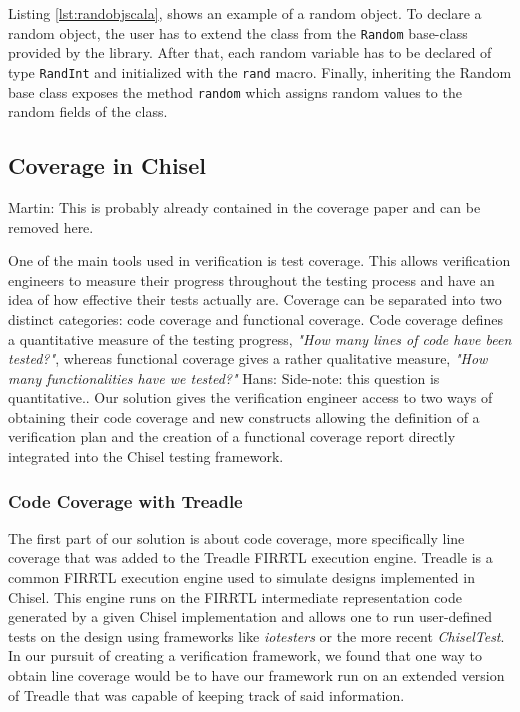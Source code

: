 \documentclass[conference]{IEEEtran}
\newcommand{\code}[1]{{\small{\texttt{#1}}}}
\newcommand{\martin}[1]{{\color{blue} Martin: #1}}
\newcommand{\hjd}[1]{{\color{pink} Hans: #1}}
\begin{document}
Listing \ref{lst:randobjscala}, shows an example of a random object. To declare a random object, the user has to extend
the class from the \code{Random} base-class provided by the library. After that, each random variable has to be declared of type \code{RandInt} and initialized with the \code{rand} macro. Finally, inheriting the Random base class exposes the method \code{random} which assigns random values to the random fields of the class.

\subsection{Coverage in Chisel}

\martin{This is probably already contained in the coverage paper and can be removed here.}

One of the main tools used in verification is test coverage. This allows verification engineers to measure their progress throughout the testing process and have an idea of how effective their tests actually are. Coverage can be separated into two distinct categories: code coverage and functional coverage. Code coverage defines a quantitative measure of the testing progress, \textit{"How many lines of code have been tested?"}, whereas functional coverage gives a rather qualitative measure, \textit{"How many functionalities have we tested?"} \hjd{Side-note: this question is quantitative.}.  Our solution gives the verification engineer access to two ways of obtaining their code coverage and new constructs allowing the definition of a verification plan and the creation of a functional coverage report directly integrated into the Chisel testing framework.

\subsubsection{Code Coverage with Treadle}  
The first part of our solution is about code coverage, more specifically line coverage that was added to the Treadle FIRRTL execution engine. Treadle is a common FIRRTL execution engine used to simulate designs implemented in Chisel. This engine runs on the FIRRTL intermediate representation code generated by a given Chisel implementation and allows one to run user-defined tests on the design using frameworks like \textit{iotesters} or the more recent \textit{ChiselTest}. In our pursuit of creating a verification framework, we found that one way to obtain line coverage would be to have our framework run on an extended version of Treadle that was capable of keeping track of said information.
\end{document}
